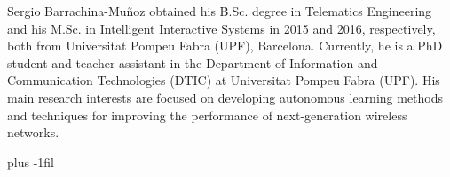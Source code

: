 \documentclass[10pt,journal,compsoc]{IEEEtran}
\begin{document}
	\begin{IEEEbiography}{Sergio Barrachina-Mu\~noz} obtained his B.Sc. degree in Telematics Engineering and his M.Sc. in Intelligent Interactive Systems in 2015 and 2016, respectively, both from Universitat Pompeu Fabra (UPF), Barcelona. Currently, he is a PhD student and teacher assistant in the Department of Information and Communication Technologies (DTIC) at Universitat Pompeu Fabra (UPF). His main research interests are focused on developing autonomous learning methods and techniques for improving the performance of next-generation wireless networks.
	\end{IEEEbiography}
	\vskip -20pt plus -1fil
\end{document}
